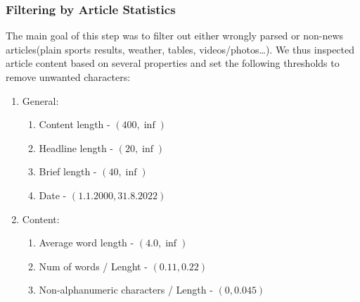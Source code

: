 \subsubsection{Filtering by Article Statistics}
The main goal of this step was to filter out either wrongly parsed
or non-news articles(plain sports results, weather, tables, videos/photos\dots).
We thus inspected article content based on several properties
and set the following thresholds to remove unwanted characters:
\begin{enumerate}
    \item General:
    \begin{enumerate}
        \item Content length - $(400, \inf)$
        \item Headline length - $(20, \inf)$
        \item Brief length - $(40, \inf)$
        \item Date - $(1.1.2000, 31.8.2022)$
    \end{enumerate}
    \item Content:
    \begin{enumerate}
        \item Average word length - $(4.0, \inf)$
        \item Num of words / Lenght - $(0.11, 0.22)$
        \item Non-alphanumeric characters / Length - $(0, 0.045)$
    \end{enumerate}
\end{enumerate}

